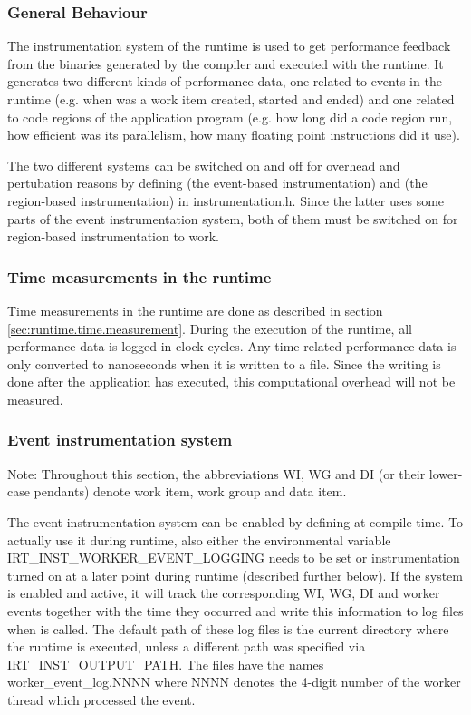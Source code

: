 \subsubsection{General Behaviour}
\label{sec:runtime.instrumentation.general.behaviour}

The instrumentation system of the runtime is used to get performance feedback
from the binaries generated by the compiler and executed with the runtime. It
generates two different kinds of performance data, one related to events in the
runtime (e.g. when was a work item created, started and ended) and one related
to code regions of the application program (e.g. how long did a code region run,
how efficient was its parallelism, how many floating point instructions did it
use).

The two different systems can be switched on and off for overhead and
pertubation reasons by defining  (the
event-based instrumentation) and 
(the region-based instrumentation) in instrumentation.h. Since the latter uses
some parts of the event instrumentation system, both of them must be switched on
for region-based instrumentation to work.

\subsubsection{Time measurements in the runtime}

Time measurements in the runtime are done as described in section
\ref{sec:runtime.time.measurement}. During the execution of the runtime, all
performance data is logged in clock cycles. Any time-related performance data is
only converted to nanoseconds when it is written to a file. Since the writing is
done after the application has executed, this computational overhead will not be
measured.

\subsubsection{Event instrumentation system}

Note: Throughout this section, the abbreviations WI, WG and DI (or their
lower-case pendants) denote work item, work group and data item.

The event instrumentation system can be enabled by defining
 at compile time. To actually use it
during runtime, also either the environmental variable
IRT\_INST\_WORKER\_EVENT\_LOGGING needs to be set or instrumentation turned on
at a later point during runtime (described further below). If the system is
enabled and active, it will track the corresponding WI, WG, DI and worker events
together with the time they occurred and write this information to log files
when  is called. The default path of these log
files is the current directory where the runtime is executed, unless a different
path was specified via IRT\_INST\_OUTPUT\_PATH. The files have the names
worker\_event\_log.NNNN where NNNN denotes the 4-digit number of the worker
thread which processed the event.

